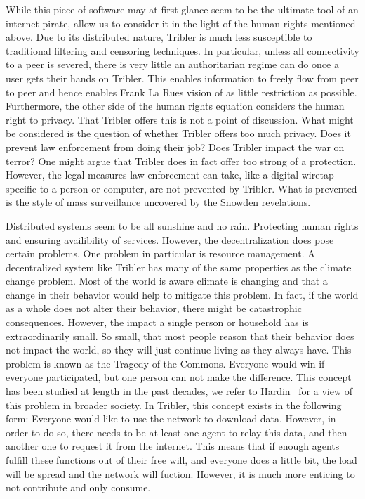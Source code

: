 \documentclass[a4paper,11pt]{book}
\theoremstyle{definition}
\begin{document}
While this piece of software may at first glance seem to be the ultimate tool of an internet pirate, 
allow us to consider it in the light of the human rights mentioned above. Due to its
distributed nature, Tribler is much less susceptible to traditional filtering and
censoring techniques. In particular, unless all connectivity to a peer is severed,
there is very little an authoritarian regime can do once a user gets their hands
on Tribler. This enables information to freely flow from peer to peer and hence 
enables Frank La Rues vision of as little restriction as possible. 
Furthermore, the other side of the human rights equation considers the human
right to privacy. That Tribler offers this is not a point of discussion. What might
be considered is the question of whether Tribler offers too much privacy. Does it
prevent law enforcement from doing their job? Does Tribler impact the war on terror?
One might argue that Tribler does in fact offer too strong of a protection.
However, the legal measures law enforcement can take, like a digital
wiretap specific to a person or computer, are not prevented by Tribler. What is
prevented is the style of mass surveillance uncovered by the Snowden revelations. 

Distributed systems seem to be all sunshine and no rain. Protecting human rights 
and ensuring availibility of services. However, the decentralization does pose certain 
problems. One problem in particular is resource management. A decentralized system
like Tribler has many of the same properties as the climate change problem. Most of the
world is aware climate is changing and that a change in their behavior would help to
mitigate this problem. In fact, if the world as a whole does not alter their behavior,
there might be catastrophic consequences. However, the impact a single person or household
has is extraordinarily small. So small, that most people reason that their behavior
does not impact the world, so they will just continue living as they always have. 
This problem is known as the Tragedy of the Commons. Everyone would win if everyone
participated, but one person can not make the difference. 
This concept has been studied at length in the past decades, we refer to
Hardin~\cite{hardin2009tragedy} for a view of this problem in broader society.
In Tribler, this concept exists in the following form: Everyone would like to use 
the network to download data. However, in order to do so, there needs to be at least
one agent to relay this data, and then another one to request it from the internet.
This means that if enough agents fulfill these functions out of their free will,
and everyone does a little bit, the load will be spread and the network will
fuction. However, it is much more enticing to not contribute and only consume.
\end{document}
